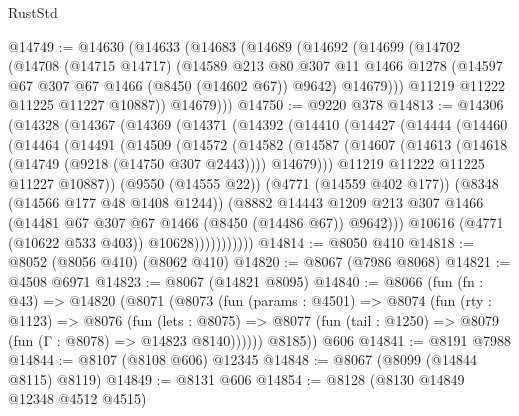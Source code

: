 \begin{lexlean}{RustStd}
\begin{coremodule}
@14749 := @14630
    (@14633
      (@14683
        (@14689
          (@14692
            (@14699
              (@14702
                (@14708
                  (@14715 @14717)
                  (@14589
                    @213
                    @80
                    @307
                    @11
                    @1466
                    @1278
                    (@14597 @67 @307 @67 @1466 (@8450 (@14602 @67)) @9642)
                    @14679)))
              @11219
              @11222
              @11225
              @11227
              @10887))
          @14679)))
@14750 := @9220 @378
@14813 := @14306
    (@14328
      (@14367
        (@14369
          (@14371
            (@14392
              (@14410
                (@14427
                  (@14444
                    (@14460
                      (@14464
                        (@14491
                          (@14509
                            (@14572
                              (@14582
                                (@14587
                                  (@14607
                                    (@14613 (@14618 (@14749 (@9218 (@14750 @307 @2443)))) @14679)))
                                @11219
                                @11222
                                @11225
                                @11227
                                @10887))
                            (@9550 (@14555 @22))
                            (@4771 (@14559 @402 @177))
                            (@8348 (@14566 @177 @48 @1408 @1244))
                            (@8882
                              @14443
                              @1209
                              @213
                              @307
                              @1466
                              (@14481 @67 @307 @67 @1466 (@8450 (@14486 @67)) @9642)))
                          @10616
                          (@4771 (@10622 @533 @403))
                          @10628)))))))))))
@14814 := @8050 @410
@14818 := @8052 (@8056 @410) (@8062 @410)
@14820 := @8067 (@7986 @8068)
@14821 := @4508 @6971
@14823 := @8067 (@14821 @8095)
@14840 := @8066
    (fun (fn : @43) =>
    @14820
      (@8071
        (@8073
          (fun (params : @4501) =>
          @8074
            (fun (rty : @1123) =>
            @8076
              (fun (lets : @8075) =>
              @8077 (fun (tail : @1250) => @8079 (fun (Γ : @8078) => @14823 @8140))))))
        @8185))
    @606
@14841 := @8191 @7988
@14844 := @8107 (@8108 @606) @12345
@14848 := @8067 (@8099 (@14844 @8115) @8119)
@14849 := @8131 @606
@14854 := @8128 (@8130 @14849 @12348 @4512 @4515)

\end{coremodule}
\end{lexlean}
